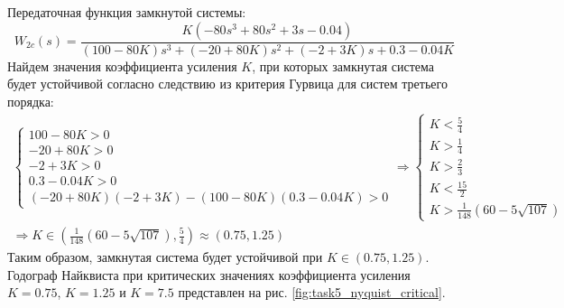 Передаточная функция замкнутой системы:
\begin{equation}
    W_{2c}(s) = \frac{K(-80s^3+80s^2+3s-0.04)}{(100 - 80K)s^3 + (-20 + 80K)s^2 + (-2 + 3K)s + 0.3 - 0.04K} 
\end{equation}
Найдем значения коэффициента усиления $K$, при которых замкнутая система будет устойчивой согласно 
следствию из критерия Гурвица для систем третьего порядка:
\begin{multline}
    \begin{cases}
        100 - 80K > 0 \\
        -20 + 80K > 0 \\
        -2 + 3K > 0 \\
        0.3 - 0.04K > 0 \\ 
       (-20 + 80K)(-2 + 3K) - (100 - 80K)(0.3 - 0.04K) > 0
    \end{cases} 
    \Rightarrow \begin{cases}
        K < \frac{5}{4} \\
        K > \frac{1}{4} \\
        K > \frac{2}{3} \\
        K < \frac{15}{2} \\
        K > \frac{1}{148}(60 - 5\sqrt{107})
    \end{cases} \\  \Rightarrow K \in \left(\frac{1}{148}(60 - 5\sqrt{107}), \frac{5}{4}\right) \approx (0.75, 1.25)
\end{multline}
\pagebreak
Таким образом, замкнутая система будет устойчивой при $K \in (0.75, 1.25)$.
Годограф Найквиста при критических значениях коэффициента усиления $K = 0.75$, $K = 1.25$ и $K = 7.5$ представлен на рис. \ref{fig:task5_nyquist_critical}.
